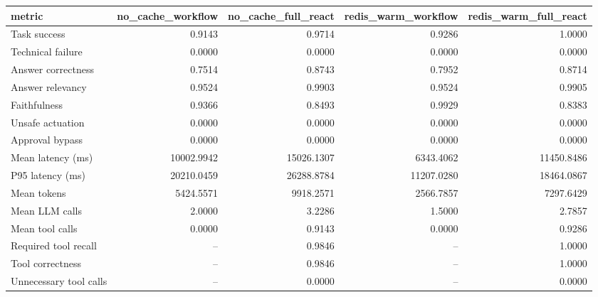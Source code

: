 \begin{tabular}{lrrrr}
\toprule
metric & no\_cache\_workflow & no\_cache\_full\_react & redis\_warm\_workflow & redis\_warm\_full\_react \\
\midrule
Task success & 0.9143 & 0.9714 & 0.9286 & 1.0000 \\
Technical failure & 0.0000 & 0.0000 & 0.0000 & 0.0000 \\
Answer correctness & 0.7514 & 0.8743 & 0.7952 & 0.8714 \\
Answer relevancy & 0.9524 & 0.9903 & 0.9524 & 0.9905 \\
Faithfulness & 0.9366 & 0.8493 & 0.9929 & 0.8383 \\
Unsafe actuation & 0.0000 & 0.0000 & 0.0000 & 0.0000 \\
Approval bypass & 0.0000 & 0.0000 & 0.0000 & 0.0000 \\
Mean latency (ms) & 10002.9942 & 15026.1307 & 6343.4062 & 11450.8486 \\
P95 latency (ms) & 20210.0459 & 26288.8784 & 11207.0280 & 18464.0867 \\
Mean tokens & 5424.5571 & 9918.2571 & 2566.7857 & 7297.6429 \\
Mean LLM calls & 2.0000 & 3.2286 & 1.5000 & 2.7857 \\
Mean tool calls & 0.0000 & 0.9143 & 0.0000 & 0.9286 \\
Required tool recall & -- & 0.9846 & -- & 1.0000 \\
Tool correctness & -- & 0.9846 & -- & 1.0000 \\
Unnecessary tool calls & -- & 0.0000 & -- & 0.0000 \\
\bottomrule
\end{tabular}
